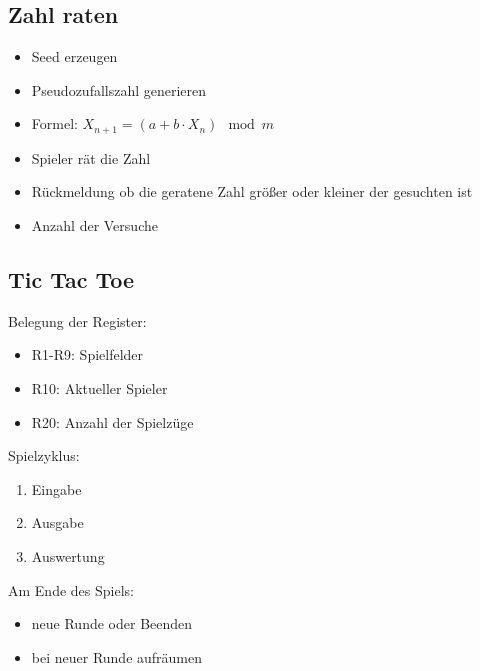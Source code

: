 \subsection{Zahl raten}
 \begin{itemize}
 \item Seed erzeugen
 \item Pseudozufallszahl generieren
 \item Formel: $X_{n+1} = (a + b\cdot X_n) \mod m$
 \item Spieler rät die Zahl
 \item Rückmeldung ob die geratene Zahl größer oder kleiner der gesuchten ist
 \item Anzahl der Versuche
 \end{itemize}

\subsection{Tic Tac Toe}
 Belegung der Register:
 \begin{itemize}
 \item R1-R9: Spielfelder
 \item R10: Aktueller Spieler
 \item R20: Anzahl der Spielzüge
 \end{itemize}
 Spielzyklus:
 \begin{enumerate}
 \item Eingabe
 \item Ausgabe
 \item Auswertung
 \end{enumerate}

Am Ende des Spiels:
\begin{itemize}
 \item neue Runde oder Beenden
 \item bei neuer Runde aufräumen
\end{itemize}











